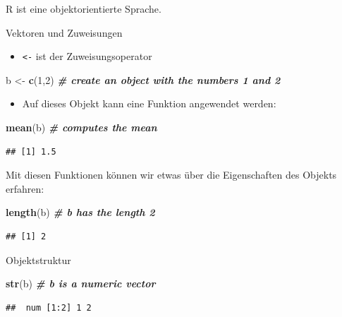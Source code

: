 \documentclass[ignorenonframetext,]{beamer}
\newenvironment{Shaded}{\begin{snugshade}}{\end{snugshade}}
\newcommand{\CommentTok}[1]{\textcolor[rgb]{0.00,0.40,1.00}{\textbf{\textit{#1}}}}
\newcommand{\DecValTok}[1]{\textcolor[rgb]{0.27,0.67,0.26}{#1}}
\newcommand{\KeywordTok}[1]{\textcolor[rgb]{0.26,0.66,0.93}{\textbf{#1}}}
\newcommand{\NormalTok}[1]{\textcolor[rgb]{0.74,0.68,0.62}{#1}}
\newcommand{\StringTok}[1]{\textcolor[rgb]{0.02,0.61,0.04}{#1}}
\providecommand{\tightlist}{%
  \setlength{\itemsep}{0pt}\setlength{\parskip}{0pt}}
\begin{document}
\begin{frame}[fragile]{R ist eine objektorientierte Sprache.}
\protect\hypertarget{r-ist-eine-objektorientierte-sprache.}{}

\begin{block}{Vektoren und Zuweisungen}

\begin{itemize}
\tightlist
\item
  \texttt{\textless{}-} ist der Zuweisungsoperator
\end{itemize}

\begin{Shaded}
\begin{Highlighting}[]
\NormalTok{b <-}\StringTok{ }\KeywordTok{c}\NormalTok{(}\DecValTok{1}\NormalTok{,}\DecValTok{2}\NormalTok{) }\CommentTok{# create an object with the numbers 1 and 2}
\end{Highlighting}
\end{Shaded}

\begin{itemize}
\tightlist
\item
  Auf dieses Objekt kann eine Funktion angewendet werden:
\end{itemize}

\begin{Shaded}
\begin{Highlighting}[]
\KeywordTok{mean}\NormalTok{(b) }\CommentTok{# computes the mean}
\end{Highlighting}
\end{Shaded}

\begin{verbatim}
## [1] 1.5
\end{verbatim}

Mit diesen Funktionen können wir etwas über die Eigenschaften des
Objekts erfahren:

\begin{Shaded}
\begin{Highlighting}[]
\KeywordTok{length}\NormalTok{(b) }\CommentTok{# b has the length 2}
\end{Highlighting}
\end{Shaded}

\begin{verbatim}
## [1] 2
\end{verbatim}

\end{block}

\begin{block}{Objektstruktur}

\begin{Shaded}
\begin{Highlighting}[]
\KeywordTok{str}\NormalTok{(b) }\CommentTok{# b is a numeric vector}
\end{Highlighting}
\end{Shaded}

\begin{verbatim}
##  num [1:2] 1 2
\end{verbatim}

\end{block}

\end{frame}
\end{document}
